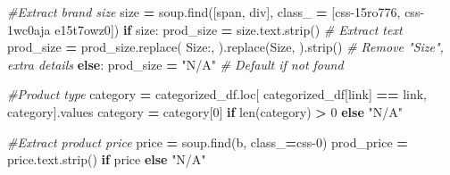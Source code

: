 \documentclass[
]{article}
\newenvironment{Shaded}{\begin{snugshade}}{\end{snugshade}}
\newcommand{\BuiltInTok}[1]{#1}
\newcommand{\CommentTok}[1]{\textcolor[rgb]{0.56,0.35,0.01}{\textit{#1}}}
\newcommand{\ControlFlowTok}[1]{\textcolor[rgb]{0.13,0.29,0.53}{\textbf{#1}}}
\newcommand{\DecValTok}[1]{\textcolor[rgb]{0.00,0.00,0.81}{#1}}
\newcommand{\NormalTok}[1]{#1}
\newcommand{\OperatorTok}[1]{\textcolor[rgb]{0.81,0.36,0.00}{\textbf{#1}}}
\newcommand{\StringTok}[1]{\textcolor[rgb]{0.31,0.60,0.02}{#1}}
\begin{document}
\begin{Shaded}
\begin{Highlighting}[]
        \CommentTok{\#Extract brand size}
\NormalTok{        size }\OperatorTok{=}\NormalTok{ soup.find([}\StringTok{\textquotesingle{}span\textquotesingle{}}\NormalTok{, }\StringTok{\textquotesingle{}div\textquotesingle{}}\NormalTok{], class\_ }\OperatorTok{=}\NormalTok{ [}\StringTok{\textquotesingle{}css{-}15ro776\textquotesingle{}}\NormalTok{, }
                                                \StringTok{\textquotesingle{}css{-}1wc0aja e15t7owz0\textquotesingle{}}\NormalTok{])}
        \ControlFlowTok{if}\NormalTok{ size:}
\NormalTok{          prod\_size }\OperatorTok{=}\NormalTok{ size.text.strip()   }\CommentTok{\# Extract text }
\NormalTok{          prod\_size }\OperatorTok{=}\NormalTok{ prod\_size.replace(}
            \StringTok{\textquotesingle{}Size:\textquotesingle{}}\NormalTok{, }\StringTok{\textquotesingle{}\textquotesingle{}}\NormalTok{).replace(}\StringTok{\textquotesingle{}Size\textquotesingle{}}\NormalTok{, }\StringTok{\textquotesingle{}\textquotesingle{}}\NormalTok{).strip()  }\CommentTok{\# Remove "Size", extra details}
        \ControlFlowTok{else}\NormalTok{:}
\NormalTok{          prod\_size }\OperatorTok{=} \StringTok{"N/A"}  \CommentTok{\# Default if not found}
          
        \CommentTok{\#Product type}
\NormalTok{        category }\OperatorTok{=}\NormalTok{ categorized\_df.loc[}
\NormalTok{          categorized\_df[}\StringTok{\textquotesingle{}link\textquotesingle{}}\NormalTok{] }\OperatorTok{==}\NormalTok{ link, }\StringTok{\textquotesingle{}category\textquotesingle{}}\NormalTok{].values}
\NormalTok{        category }\OperatorTok{=}\NormalTok{ category[}\DecValTok{0}\NormalTok{] }\ControlFlowTok{if} \BuiltInTok{len}\NormalTok{(category) }\OperatorTok{\textgreater{}} \DecValTok{0} \ControlFlowTok{else} \StringTok{"N/A"}  
        
        \CommentTok{\#Extract product price}
\NormalTok{        price }\OperatorTok{=}\NormalTok{ soup.find(}\StringTok{\textquotesingle{}b\textquotesingle{}}\NormalTok{, class\_}\OperatorTok{=}\StringTok{\textquotesingle{}css{-}0\textquotesingle{}}\NormalTok{)}
\NormalTok{        prod\_price }\OperatorTok{=}\NormalTok{ price.text.strip() }\ControlFlowTok{if}\NormalTok{ price }\ControlFlowTok{else} \StringTok{"N/A"}
        

\end{Highlighting}
\end{Shaded}
\end{document}
